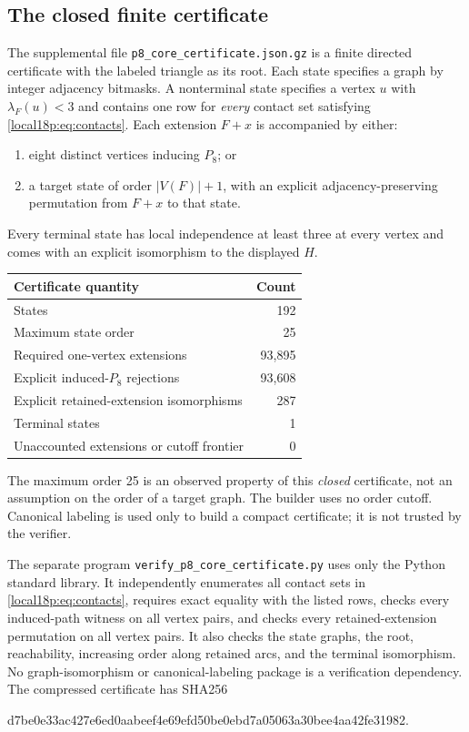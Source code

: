 \documentclass[11pt,a4paper]{article}
\theoremstyle{definition}\newtheorem{definition}[theorem]{Definition}
\theoremstyle{remark}\newtheorem{remark}[theorem]{Remark}
\begin{document}
\subsection{The closed finite certificate}
The supplemental file \texttt{p8\_core\_certificate.json.gz} is a finite
directed certificate with the labeled triangle as its root. Each state
specifies a graph by integer adjacency bitmasks. A nonterminal state
specifies a vertex $u$ with $\lambda_F(u)<3$ and contains one row for
\emph{every} contact set satisfying \eqref{local18p:eq:contacts}. Each extension
$F+x$ is accompanied by either:
\begin{enumerate}[label=\textup{(\alph*)}]
\item eight distinct vertices inducing $P_8$; or
\item a target state of order $|V(F)|+1$, with an explicit
adjacency-preserving permutation from $F+x$ to that state.
\end{enumerate}
Every terminal state has local independence at least three at every
vertex and comes with an explicit isomorphism to the displayed $H$.

\begin{center}
\begin{tabular}{lr}
\toprule
Certificate quantity&Count\\\midrule
States&192\\
Maximum state order&25\\
Required one-vertex extensions&93,895\\
Explicit induced-$P_8$ rejections&93,608\\
Explicit retained-extension isomorphisms&287\\
Terminal states&1\\
Unaccounted extensions or cutoff frontier&0\\\bottomrule
\end{tabular}
\end{center}

The maximum order 25 is an observed property of this \emph{closed}
certificate, not an assumption on the order of a target graph. The
builder uses no order cutoff. Canonical labeling is used only to build
a compact certificate; it is not trusted by the verifier.

The separate program \texttt{verify\_p8\_core\_certificate.py} uses only
the Python standard library. It independently enumerates all contact
sets in \eqref{local18p:eq:contacts}, requires exact equality with the listed
rows, checks every induced-path witness on all vertex pairs, and checks
every retained-extension permutation on all vertex pairs. It also
checks the state graphs, the root, reachability, increasing order along
retained arcs, and the terminal isomorphism. No graph-isomorphism or
canonical-labeling package is a verification dependency.
The compressed certificate has SHA256
\begin{center}\small\ttfamily
 d7be0e33ac427e6ed0aabeef4e69efd50be0ebd7a05063a30bee4aa42fe31982.
\end{center}
\end{document}
